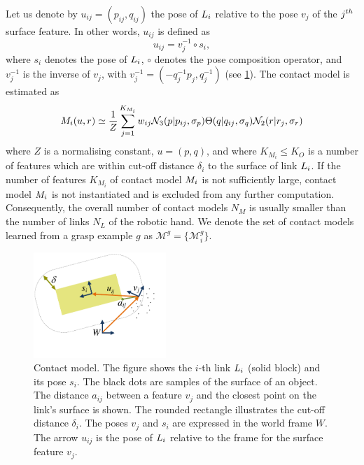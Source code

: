 Let us denote by $u_{ij} = (p_{ij}, q_{ij})$ the pose of $L_i$ relative to the pose $v_j$ of the $j^{\mathnormal{th}}$ surface feature. In other words, $u_{ij}$ is defined as
\begin{equation}
u_{ij} = v_j^{-1} \circ s_i,
\label{eq:local.pose}
\end{equation}
where $s_i$ denotes the pose of $L_i$, $\circ$ denotes the pose composition operator, and $v_j^{-1}$ is the inverse of $v_j$, with $v_j^{-1} = (-q_j^{-1}p_j, q_j^{-1})$ (see \fig\ref{fig:representations.model}). The contact model is estimated as
\begin{equation}
M_i(u,r) \simeq \frac 1Z \sum^{K_{M_i}}_{j=1} w_{ij}\mathcal{N}_3(p|{p_{ij}}, \sigma_{p}) \Theta(q|{q_{ij}}, \sigma_{q}) \mathcal{N}_2(r|{r_j}, \sigma_{r})
\label{eq:cm}
\end{equation}
where $Z$ is a normalising constant, $u = (p, q)$, and where $K_{M_i} \leq K_O$ is a number of features which are within cut-off distance $\delta_i$ to the surface of link $L_i$. If the number of features $K_{M_i}$ of contact model $M_i$ is not sufficiently large, contact model $M_i$ is not instantiated and is excluded from any further computation. Consequently, the overall number of contact models $N_M$ is usually smaller than the number of links $N_L$ of the robotic hand. We denote the set of contact models learned from a grasp example $g$ as $\mathcal{M}^g=\{\mathcal{M}^g_i\}$. 
\begin{figure}[t]
\centerline{\includegraphics[width=5cm]{resources/model}}
\caption[Contact model]{Contact model. The figure shows the $i$-th link $L_i$ (solid block) and its pose $s_i$. The black dots are samples of the surface of an object. The distance $a_{ij}$ between a feature $v_j$ and the closest point on the link's surface is shown. The rounded rectangle illustrates the cut-off distance $\delta_i$. The poses $v_j$ and $s_i$ are expressed in the world frame $W$. The arrow $u_{ij}$ is the pose of $L_i$ relative to the frame for the surface feature $v_j$.}
\label{fig:representations.model}
\end{figure}

